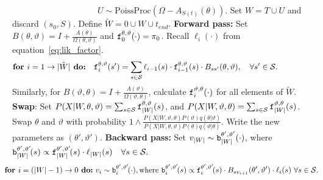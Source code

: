 \begin{algorithm}[H]
\begin{algorithmic}[1]
    \vspace{-.05in}
    $\qquad \qquad \qquad \qquad \qquad U \sim \text{PoissProc}(\Omega - A_{S(t)}(\theta))$.
    \State Set $W = T \cup U$ and discard $(s_0,S)$. Define $\tilde{W} = 0 \cup W \cup t_{end}$.
    \State \textbf{Forward pass:} Set $B(\theta,\vartheta) = I + \frac{A(\theta)}{\Omega(\theta, \vartheta)}$ and $\mathtt{f}^{\theta, \vartheta}_0(\cdot) = \pi_0$. Recall $\ell_i(\cdot)$ from equation~\eqref{eq:lik_factor}.
    \vspace{-.25in}
        $$\textbf{for } i=1\rightarrow |\tilde{W}|\textbf{ do:} \quad \fwd^{\theta,\vartheta}_i(s') = \sum_{s \in \cS} \ell_{i-1}(s) \cdot \fwd^{\theta,\vartheta}_{i-1}(s)\cdot B_{ss'}(\theta,\vartheta), \quad \forall s' \in \cS.\qquad\qquad\quad
    \vspace{-.1in}
        $$
        Similarly, for $B(\vartheta,\theta) = I + \frac{A(\vartheta)}{\Omega(\vartheta, \theta)}$, calculate $\mathtt{f}^{\vartheta,\theta}_i(\cdot)$ for all elements of $\tilde{W}$.
    \State \textbf{Swap}: 
        Set $P(X|W,\theta,\vartheta) = \sum_{s \in {\mathcal S}} \mathtt{f}^{\theta,\vartheta}_{|W|}(s)$, and $P(X|W,\vartheta,\theta) = \sum_{s \in {\mathcal S}} \mathtt{f}^{\vartheta,\theta}_{|W|}(s)$.
        Swap $\theta$ and $\vartheta$ with probability 
     $
     1 \wedge \frac{P(X| W,\vartheta,\theta)P(\vartheta)q(\theta|\vartheta)}
        {P(X| W,\theta, \vartheta)P(\theta) q(\vartheta|\theta)}.
        $
    Write the new parameters as $(\theta',\vartheta')$.
    \State \textbf{Backward pass:}
    Set $v_{|W|} \sim \mathtt{b}^{\theta',\vartheta'}_{|W|}(\cdot)$, where $\mathtt{b}^{\theta',\vartheta'}_{|W|}\!(s) \propto \mathtt{f}^{\theta',\vartheta'}_{|W|}\!(s)\cdot\ell_{|W|}(s) \quad \forall s \in {\mathcal S}.$ 
    \vspace{-.1in}
    $$\hspace{-.15in} \textbf{for } i=(|W|-1)\rightarrow 0\textbf{ do:} \ v_i \sim \bck^{\theta',\vartheta'}_i\!(\cdot), \text{where } 
    \bck^{\theta',\vartheta'}_i\!(s) \propto \fwd^{\theta',\vartheta'}_i\!(s)\cdot B_{sv_{i+1}}(\theta',\vartheta') \cdot \ell_i(s)  \ \forall s \in \cS.$$
    

\end{algorithmic}
\end{algorithm}
